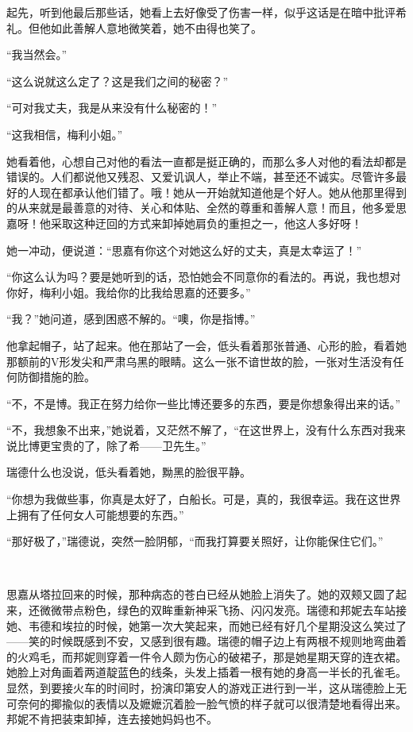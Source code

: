 \par 起先，听到他最后那些话，她看上去好像受了伤害一样，似乎这话是在暗中批评希礼。但他如此善解人意地微笑着，她不由得也笑了。
\par “我当然会。”
\par “这么说就这么定了？这是我们之间的秘密？”
\par “可对我丈夫，我是从来没有什么秘密的！”
\par “这我相信，梅利小姐。”
\par 她看着他，心想自己对他的看法一直都是挺正确的，而那么多人对他的看法却都是错误的。人们都说他又残忍、又爱讥讽人，举止不端，甚至还不诚实。尽管许多最好的人现在都承认他们错了。哦！她从一开始就知道他是个好人。她从他那里得到的从来就是最善意的对待、关心和体贴、全然的尊重和善解人意！而且，他多爱思嘉呀！他采取这种迂回的方式来卸掉她肩负的重担之一，他这人多好呀！
\par 她一冲动，便说道：“思嘉有你这个对她这么好的丈夫，真是太幸运了！”
\par “你这么认为吗？要是她听到的话，恐怕她会不同意你的看法的。再说，我也想对你好，梅利小姐。我给你的比我给思嘉的还要多。”
\par “我？”她问道，感到困惑不解的。“噢，你是指博。”
\par 他拿起帽子，站了起来。他在那站了一会，低头看着那张普通、心形的脸，看着她那额前的V形发尖和严肃乌黑的眼睛。这么一张不谙世故的脸，一张对生活没有任何防御措施的脸。
\par “不，不是博。我正在努力给你一些比博还要多的东西，要是你想象得出来的话。”
\par “不，我想象不出来，”她说着，又茫然不解了，“在这世界上，没有什么东西对我来说比博更宝贵的了，除了希——卫先生。”
\par 瑞德什么也没说，低头看着她，黝黑的脸很平静。
\par “你想为我做些事，你真是太好了，白船长。可是，真的，我很幸运。我在这世界上拥有了任何女人可能想要的东西。”
\par “那好极了，”瑞德说，突然一脸阴郁，“而我打算要关照好，让你能保住它们。”
\par  
\par 思嘉从塔拉回来的时候，那种病态的苍白已经从她脸上消失了。她的双颊又圆了起来，还微微带点粉色，绿色的双眸重新神采飞扬、闪闪发亮。瑞德和邦妮去车站接她、韦德和埃拉的时候，她第一次大笑起来，而她已经有好几个星期没这么笑过了——笑的时候既感到不安，又感到很有趣。瑞德的帽子边上有两根不规则地弯曲着的火鸡毛，而邦妮则穿着一件令人颇为伤心的破裙子，那是她星期天穿的连衣裙。她脸上对角画着两道靛蓝色的线条，头发上插着一根有她的身高一半长的孔雀毛。显然，到要接火车的时间时，扮演印第安人的游戏正进行到一半，这从瑞德脸上无可奈何的揶揄似的表情以及嬷嬷沉着脸一脸气愤的样子就可以很清楚地看得出来。邦妮不肯把装束卸掉，连去接她妈妈也不。

